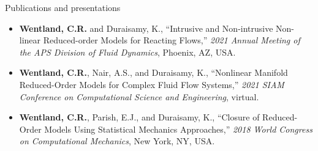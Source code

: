 \documentclass[]{beamer}
\begin{document}
\begin{frame}{Publications and presentations}
\begin{itemize}
		\vspace{0.5em}
		\begin{itemize}
			\item \tiny \textbf{Wentland, C.R.} and Duraisamy, K., ``Intrusive and Non-intrusive Non-linear Reduced-order Models for Reacting Flows,'' \textit{2021 Annual Meeting of the APS Division of Fluid Dynamics}, Phoenix, AZ, USA.
			\item \textbf{Wentland, C.R.}, Nair, A.S., and Duraisamy, K., ``Nonlinear Manifold Reduced-Order Models for Complex Fluid Flow Systems,'' \textit{2021 SIAM Conference on Computational Science and Engineering}, virtual.
			\item \tiny \textbf{Wentland, C.R.}, Parish, E.J., and Duraisamy, K., ``Closure of Reduced-Order Models Using Statistical Mechanics Approaches,'' \textit{2018 World Congress on Computational Mechanics}, New York, NY, USA.
		\end{itemize}
	\end{itemize}
\end{frame}
\end{document}

